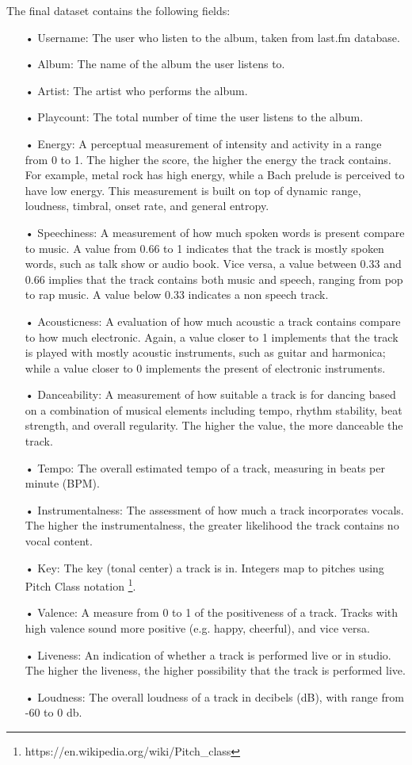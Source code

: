 The final dataset contains the following fields:

\begin{itemize}
\item[•] Username: The user who listen to the album, taken from last.fm database.
\item[•] Album: The name of the album the user listens to.
\item[•] Artist: The artist who performs the album.
\item[•] Playcount: The total number of time the user listens to the album.
\item[•] Energy: A perceptual measurement of intensity and activity in a range from 0 to 1. The higher the score, the higher the energy the track contains. For example, metal rock has high energy, while a Bach prelude is perceived to have low energy. This measurement is built on top of dynamic range, loudness, timbral, onset rate, and general entropy.
\item[•] Speechiness: A measurement of how much spoken words is present compare to music. A value from 0.66 to 1 indicates that the track is mostly spoken words, such as talk show or audio book. Vice versa, a value between 0.33 and 0.66 implies that the track contains both music and speech, ranging from pop to rap music. A value below 0.33 indicates a non speech track. 
\item[•] Acousticness: A evaluation of how much acoustic a track contains compare to how much electronic. Again, a value closer to 1 implements that the track is played with mostly acoustic instruments, such as guitar and harmonica; while a value closer to 0 implements the present of electronic instruments.
\item[•] Danceability: A measurement of how suitable a track is for dancing based on a combination of musical elements including tempo, rhythm stability,  beat strength, and overall regularity. The higher the value, the more danceable the track.
\item[•] Tempo: The overall estimated tempo of a track, measuring in beats per minute (BPM).
\item[•] Instrumentalness: The assessment of how much a track incorporates vocals. The higher the instrumentalness, the greater likelihood the track contains no vocal content. 
\item[•] Key: The key (tonal center) a track is in. Integers map to pitches using Pitch Class notation \footnote{https://en.wikipedia.org/wiki/Pitch\_class}. 
\item[•] Valence: A measure from 0 to 1 of the positiveness of a track. Tracks with high valence sound more positive (e.g. happy, cheerful), and vice versa.
\item[•] Liveness: An indication of whether a track is performed live or in studio. The higher the liveness, the higher possibility that the track is performed live.
\item[•] Loudness: The overall loudness of a track in decibels (dB), with range from -60 to 0 db. 
\end{itemize}


